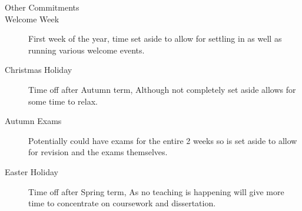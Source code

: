 \documentclass{article}
\begin{document}
\begin{description}
\item [\large{Other Commitments}]
\item [Welcome Week] First week of the year, time set aside to allow for settling in as well as running various welcome events.
\item [Christmas Holiday] Time off after Autumn term, Although not completely set aside allows for some time to relax.
\item [Autumn Exams] Potentially could have exams for the entire 2 weeks so is set aside to allow for revision and the exams themselves.
\item [Easter Holiday] Time off after Spring term, As no teaching is happening will give more time to concentrate on coursework and dissertation.
\end{description}

\nocite{worldsOverview}


\end{document}
